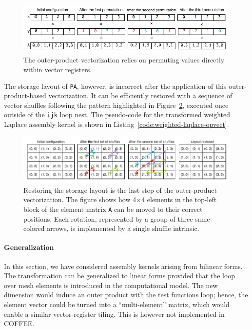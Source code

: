 \begin{figure}[h]
\centerline{\includegraphics[scale=0.6]{lowlevelopt/pictures/vect-by-vect-inline.pdf}}
\caption{The outer-product vectorization relies on permuting values directly within vector registers.}
\label{fig:vect-by-vect}
\end{figure}

The storage layout of {\tt PA}, however, is incorrect after the application of this outer-product-based vectorization. It can be efficiently restored with a sequence of vector shuffles following the pattern highlighted in Figure~\ref{fig:restore-layout}, executed once outside of the \texttt{ijk} loop nest. The pseudo-code for the transformed weighted Laplace assembly kernel is shown in Listing~\ref{code:weighted-laplace-opvect}.

\begin{figure}[h]
\centerline{\includegraphics[scale=0.6]{lowlevelopt/pictures/vect-restore-inline.pdf}}
\caption{Restoring the storage layout is the last step of the outer-product vectorization. The figure shows how 4$\times$4 elements in the top-left block of the element matrix {\tt A} can be moved to their correct positions. Each rotation, represented by a group of three same-colored arrows, is implemented by a single shuffle intrinsic.}
\label{fig:restore-layout}
\end{figure}

\paragraph{Generalization}
In this section, we have considered assembly kernels arising from bilinear forms. The transformation can be generalized to linear forms provided that the loop over mesh elements is introduced in the computational model. The new dimension would induce an outer product with the test functions loop; hence, the element vector could be turned into a ``multi-element'' matrix, which would enable a similar vector-register tiling. This is however not implemented in COFFEE.

